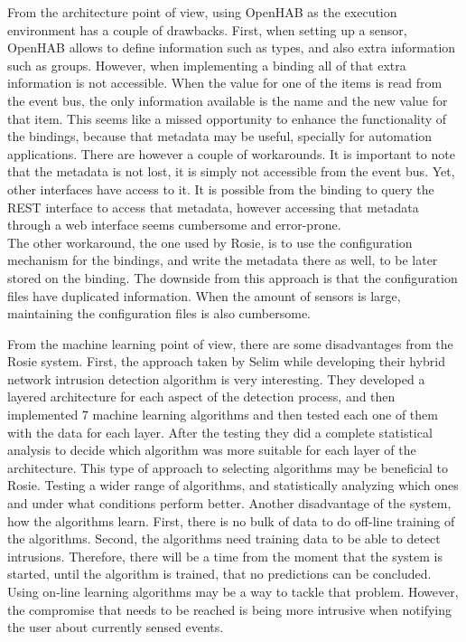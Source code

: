 From the architecture point of view, using OpenHAB as the execution environment has a couple of drawbacks. First, 
when setting up a sensor, OpenHAB allows to define information such as types, and also extra information such as groups. However, when implementing a binding all of that extra information is not accessible. When the value for one of the items is read from the event bus, the only information available is the name and the new value for that item. This seems like a missed opportunity to enhance the functionality of the bindings, because that metadata may be useful, specially for automation applications. There are however a couple of workarounds. It is important to note that the metadata is not lost, it is simply not accessible from the event bus. Yet, other interfaces have access to it. It is possible from the binding to query the REST interface to access that metadata, however accessing that metadata through a web interface seems cumbersome and error-prone. \\
The other workaround, the one used by Rosie, is to use the configuration mechanism for the bindings, and write the metadata there as well, to be later stored on the binding. The downside from this approach is that the configuration files have duplicated information. When the amount of sensors is large, maintaining the configuration files is also cumbersome.

From the machine learning point of view, there are some disadvantages from the Rosie system. First, the approach taken by Selim \etAl \cite{hybridMultilevelIntrusion} while developing their hybrid network intrusion detection algorithm is very interesting. They developed a layered architecture for each aspect of the detection process, and then implemented 7 machine learning algorithms and then tested each one of them with the data for each layer. After the testing they did a complete statistical analysis to decide which algorithm was more suitable for each layer of the architecture. This type of approach to selecting algorithms may be beneficial to Rosie. Testing a wider range of algorithms, and statistically analyzing which ones and under what conditions perform better. 
Another disadvantage of the system, how the algorithms learn. First, there is no bulk of data to do off-line training of the algorithms. Second, the algorithms need training data to be able to detect intrusions. Therefore, there will be a time from the moment that the system is started, until the algorithm is trained, that no predictions can be concluded. Using on-line learning algorithms may be a way to tackle that problem. However, the compromise that needs to be reached is being more intrusive when notifying the user about currently sensed events. 

